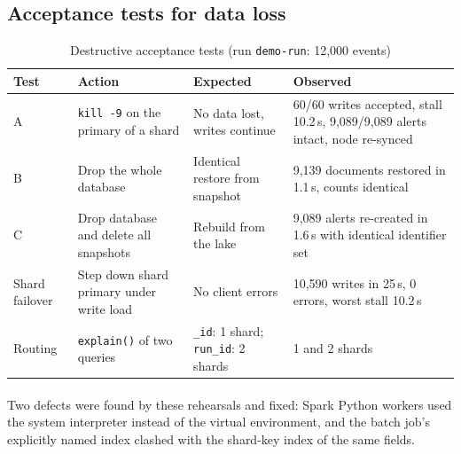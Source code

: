 \subsection{Acceptance tests for data loss}
\begin{table}[H]
\centering
\small
\begin{tabular}{|p{1.6cm}|p{3.8cm}|p{3.4cm}|p{4.2cm}|}
\hline
\textbf{Test} & \textbf{Action} & \textbf{Expected} & \textbf{Observed} \\ \hline
A & \texttt{kill -9} on the primary of a shard & No data lost, writes continue & 60/60 writes accepted, stall 10.2\,s, 9,089/9,089 alerts intact, node re-synced \\ \hline
B & Drop the whole database & Identical restore from snapshot & 9,139 documents restored in 1.1\,s, counts identical \\ \hline
C & Drop database and delete all snapshots & Rebuild from the lake & 9,089 alerts re-created in 1.6\,s with identical identifier set \\ \hline
Shard failover & Step down shard primary under write load & No client errors & 10,590 writes in 25\,s, 0 errors, worst stall 10.2\,s \\ \hline
Routing & \texttt{explain()} of two queries & \texttt{\_id}: 1 shard; \texttt{run\_id}: 2 shards & 1 and 2 shards \\ \hline
\end{tabular}
\caption{Destructive acceptance tests (run \texttt{demo-run}: 12,000 events)}
\end{table}

\paragraph{}
Two defects were found by these rehearsals and fixed: Spark Python workers used the system interpreter instead of the virtual environment, and the batch job's explicitly named index clashed with the shard-key index of the same fields.

